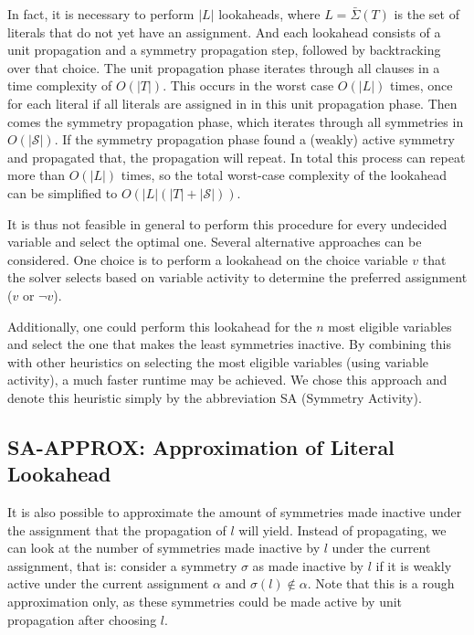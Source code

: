 	In fact, it is necessary to perform $|L|$ lookaheads, where $L = \bar{\Sigma}(T)$ is the set of
	literals that do not yet have an assignment.
	And each lookahead consists of a unit propagation and a symmetry propagation step, followed by
	backtracking over that choice.
	The unit propagation phase iterates through all clauses in a time complexity of $O(|T|)$.
	This occurs in the worst case $O(|L|)$ times,
	once for each literal if all literals are assigned in in this unit propagation phase.
	Then comes the symmetry propagation phase, which iterates through all symmetries in $O(|\mathcal{S}|)$.
	If the symmetry propagation phase found a (weakly) active symmetry and propagated that,
	the propagation will repeat.
	In total this process can repeat more than $O(|L|)$ times,
	so the total worst-case complexity of the lookahead can be simplified to $O(|L|(|T| + |\mathcal{S}|))$.

	It is thus not feasible in general to perform this procedure for every undecided variable and
	select the optimal one.
	Several alternative approaches can be considered.
	One choice is to perform a lookahead on the choice variable $v$ that the solver
	selects based on variable activity to determine the preferred assignment ($v$ or $\neg v$).

	Additionally, one could perform this lookahead for the $n$ most eligible variables
	and select the one that makes the least symmetries inactive.
	By combining this with other heuristics on selecting the most eligible variables (using variable
	activity), a much faster runtime may be achieved.
	We chose this approach and denote this heuristic simply by the abbreviation SA (Symmetry
	Activity).

\subsection{SA-APPROX: Approximation of Literal Lookahead}
	It is also possible to approximate the amount of symmetries made inactive under the
	assignment that the propagation of $l$ will yield.
	Instead of propagating, we can look at the number of symmetries made inactive by $l$
	under the current assignment, that is: consider a symmetry $\sigma$ as
	made inactive by $l$ if it is weakly active under the current assignment $\alpha$ and
	$\sigma(l) \notin \alpha$.
	Note that this is a rough approximation only, as these symmetries could be made active by
	unit propagation after choosing $l$.

